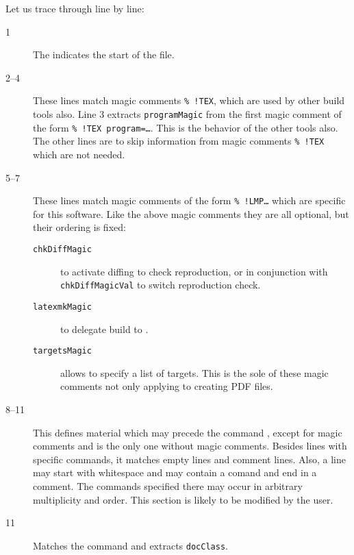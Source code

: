 Let us trace through line by line: 
%
\begin{description}
  \item[1]
  The  indicates the start of the file. 
  \item[2--4]
  These lines match magic comments \texttt{\%~!TEX}, 
  which are used by other build tools also. 
  Line 3 extracts \texttt{programMagic} 
  from the first magic comment of the form \texttt{\%~!TEX program=\dots}. 
  This is the behavior of the other tools also. 
  The other lines are to skip information from magic comments \texttt{\%~!TEX} 
  which are not needed. 
  \item[5--7]
  These lines match magic comments of the form \texttt{\%~!LMP\dots} 
  which are specific for this software. 
  Like the above magic comments they are all optional, 
  but their ordering is fixed: 
 \begin{description}
  \item[\texttt{chkDiffMagic}]
  to activate diffing to check reproduction,
  or in conjunction with \texttt{chkDiffMagicVal} to switch reproduction check.
  \item[\texttt{latexmkMagic}]
  to delegate build to .
  \item[\texttt{targetsMagic}] 
  allows to specify a list of targets.
  This is the sole of these magic comments not only applying to creating PDF files.
\end{description}
  \item[8--11]
  This defines material which may precede the command , 
  except for magic comments and is the only one without magic comments. 
  Besides lines with specific commands, it matches empty lines and comment lines. 
  Also, a line may start with whitespace 
  and may contain a comand and end in a comment. 
  The commands specified there may occur in arbitrary multiplicity and order. 
  This section is likely to be modified by the user. 
  \item[11]
  Matches the command  and extracts \texttt{docClass}. 
\end{description}



